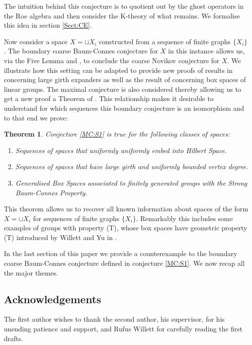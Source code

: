\documentclass[11pt]{amsart}
\theoremstyle{plain}
\newtheorem{theorem}{Theorem}%
\theoremstyle{definition}%
\theoremstyle{remark}%
\begin{document}
The intuition behind this conjecture is to quotient out by the ghost operators in the Roe algebra and then consider the K-theory of what remains. We formalise this idea in section \ref{Sect:CE}.

Now consider a space $X = \sqcup X_{i}$ constructed from a sequence of finite graphs $\lbrace X_{i}\rbrace$. The boundary coarse Baum-Connes conjecture for $X$ in this instance allows us, via the Five Lemma and \cite[Lemma 9]{MR1905840}, to conclude the coarse Novikov conjecture for $X$. We illustrate how this setting can be adapted to provide new proofs of results in \cite{explg1} concerning large girth expanders as well as the result of \cite[Theorem 5.7]{MR2764895} concerning box spaces of linear groups. The maximal conjecture is also considered thereby allowing us to get a new proof a Theorem of \cite{MR2431253,MR2419930,MR2568691}. This relationship makes it desirable to understand for which sequences this boundary conjecture is an isomorphism and to that end we prove:

\begin{theorem}\label{MT:S1}
Conjecture \ref{MC:S1} is true for the following classes of spaces:
\begin{enumerate}
\item Sequences of spaces that uniformly uniformly embed into Hilbert Space. 
\item Sequences of spaces that have large girth and uniformly bounded vertex degree.
\item Generalised Box Spaces associated to finitely generated groups with the Strong Baum-Connes Property.
\end{enumerate}
\end{theorem}
This theorem allows us to recover all known information about spaces of the form $X = \sqcup X_{i}$ for sequences of finite graphs $\lbrace X_{i} \rbrace$. Remarkably this includes some examples of groups with property (T), whose box spaces have geometric property (T) introduced by Willett and Yu in \cite{explg2}.

In the last section of this paper we provide a counterexample to the boundary coarse Baum-Connes conjecture defined in conjecture \ref{MC:S1}. We now recap all the major themes.

\subsection{Acknowledgements}
The first author wishes to thank the second author, his supervisor, for his unending patience and support, and Rufus Willett for carefully reading the first drafts.
\end{document}

